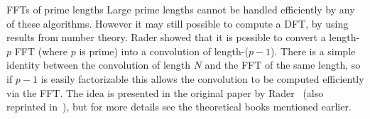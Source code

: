 \documentclass[fleqn,12pt]{article}
\begin{document}
\begin{subsection}{FFTs of prime lengths}
%
  Large prime lengths cannot be handled efficiently by any of these
algorithms. However it may still possible to compute a DFT, by using
results from number theory. Rader showed that it is possible to
convert a length-$p$ FFT (where $p$ is prime) into a convolution of
length-($p-1$).  There is a simple identity between the convolution of
length $N$ and the FFT of the same length, so if $p-1$ is easily
factorizable this allows the convolution to be computed efficiently
via the FFT. The idea is presented in the original paper by
Rader~\cite{raderprimes} (also reprinted in~\cite{mcclellan79}), but
for more details see the theoretical books mentioned earlier.
\end{subsection}







\end{document}
